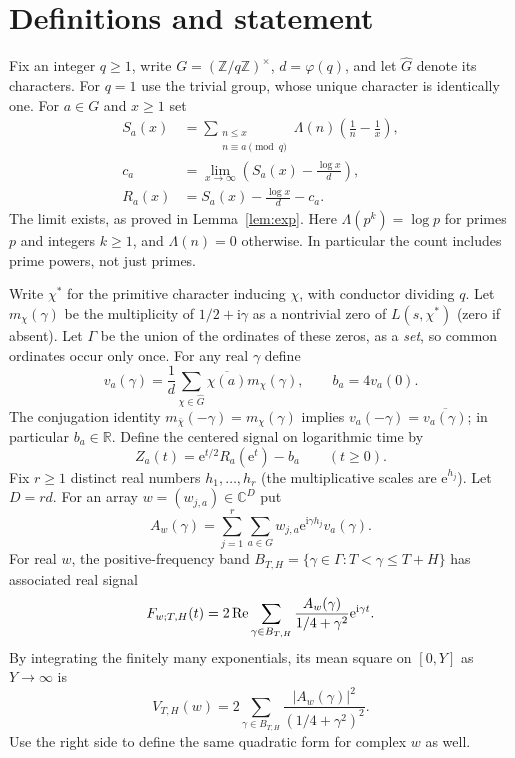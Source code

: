 \documentclass[11pt]{article}
\theoremstyle{remark}\newtheorem{remark}[theorem]{Remark}
\newcommand{\R}{\mathbb R}\newcommand{\C}{\mathbb C}\newcommand{\N}{\mathbb N}
\newcommand{\ii}{\mathrm i}\newcommand{\e}{\mathrm e}\newcommand{\ph}{\varphi}
\begin{document}
\section{Definitions and statement}
Fix an integer $q\ge1$, write $G=(\mathbb Z/q\mathbb Z)^\times$, $d=\ph(q)$, and let $\widehat G$ denote its characters. For $q=1$ use the trivial group, whose unique character is identically one. For $a\in G$ and $x\ge1$ set
\begin{align*}
 S_a(x)&=\sum_{\substack{n\le x\\ n\equiv a\pmod q}}\Lambda(n)\left(\frac1n-\frac1x\right),\\
 c_a&=\lim_{x\to\infty}\left(S_a(x)-\frac{\log x}{d}\right),\\
 R_a(x)&=S_a(x)-\frac{\log x}{d}-c_a .
\end{align*}
The limit exists, as proved in Lemma~\ref{lem:exp}. Here $\Lambda(p^k)=\log p$ for primes $p$ and integers $k\ge1$, and $\Lambda(n)=0$ otherwise. In particular the count includes prime powers, not just primes.

Write $\chi^*$ for the primitive character inducing $\chi$, with conductor dividing $q$. Let $m_\chi(\gamma)$ be the multiplicity of $1/2+\ii\gamma$ as a nontrivial zero of $L(s,\chi^*)$ (zero if absent). Let $\Gamma$ be the union of the ordinates of these zeros, as a \emph{set}, so common ordinates occur only once. For any real $\gamma$ define
\[
 v_a(\gamma)=\frac1d\sum_{\chi\in\widehat G}\overline{\chi(a)}m_\chi(\gamma),\qquad b_a=4v_a(0).
\]
The conjugation identity $m_{\bar\chi}(-\gamma)=m_\chi(\gamma)$ implies $v_a(-\gamma)=\overline{v_a(\gamma)}$; in particular $b_a\in\R$. Define the centered signal on logarithmic time by
\[
 Z_a(t)=\e^{t/2}R_a(\e^t)-b_a\qquad(t\ge0).
\]
Fix $r\ge1$ distinct real numbers $h_1,\ldots,h_r$ (the multiplicative scales are $\e^{h_j}$). Let $D=rd$. For an array $w=(w_{j,a})\in\C^D$ put
\[
 A_w(\gamma)=\sum_{j=1}^r\sum_{a\in G} w_{j,a}\e^{\ii\gamma h_j}v_a(\gamma).
\]
For real $w$, the positive-frequency band $B_{T,H}=\{\gamma\in\Gamma:T<\gamma\le T+H\}$ has associated real signal
\[
 F_{w;T,H}(t)=2\Rea\sum_{\gamma\in B_{T,H}}
 \frac{A_w(\gamma)}{1/4+\gamma^2}\e^{\ii\gamma t}.
\]
By integrating the finitely many exponentials, its mean square on $[0,Y]$ as $Y\to\infty$ is
\begin{equation}\label{eq:energy}
 V_{T,H}(w)=2\sum_{\gamma\in B_{T,H}}\frac{|A_w(\gamma)|^2}{(1/4+\gamma^2)^2}.
\end{equation}
Use the right side to define the same quadratic form for complex $w$ as well.
\end{document}
